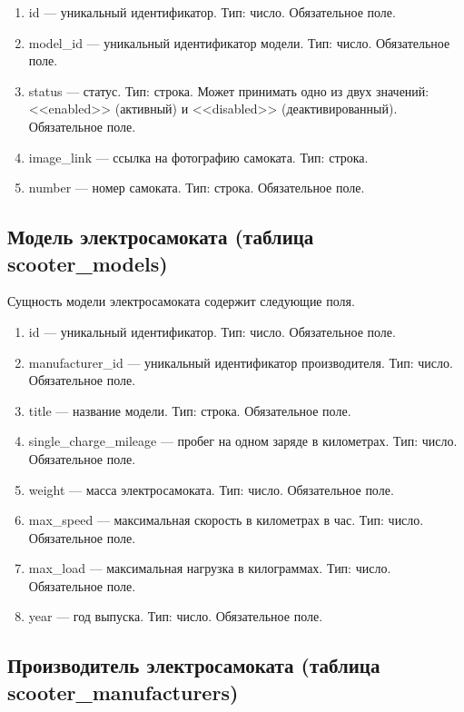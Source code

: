 \begin{enumerate}
    \item id --- уникальный идентификатор. Тип: число. Обязательное поле.
    \item model\_id --- уникальный идентификатор модели. Тип: число. Обязательное поле.
    \item status --- статус. Тип: строка. Может принимать одно из двух значений: <<enabled>> (активный) и <<disabled>> (деактивированный). Обязательное поле.
    \item image\_link --- ссылка на фотографию самоката. Тип: строка.
    \item number --- номер самоката. Тип: строка. Обязательное поле.
\end{enumerate}

\subsection{Модель электросамоката (таблица scooter\_models)}

Сущность модели электросамоката содержит следующие поля.

\begin{enumerate}
    \item id --- уникальный идентификатор. Тип: число. Обязательное поле.
    \item manufacturer\_id --- уникальный идентификатор производителя. Тип: число. Обязательное поле.
    \item title --- название модели. Тип: строка. Обязательное поле.
    \item single\_charge\_mileage --- пробег на одном заряде в километрах. Тип: число. Обязательное поле.
    \item weight --- масса электросамоката. Тип: число. Обязательное поле.
    \item max\_speed --- максимальная скорость в километрах в час. Тип: число. Обязательное поле.
    \item max\_load --- максимальная нагрузка в килограммах. Тип: число. Обязательное поле.
    \item year --- год выпуска. Тип: число. Обязательное поле.
\end{enumerate}

\subsection{Производитель электросамоката (таблица scooter\_manufacturers)}


